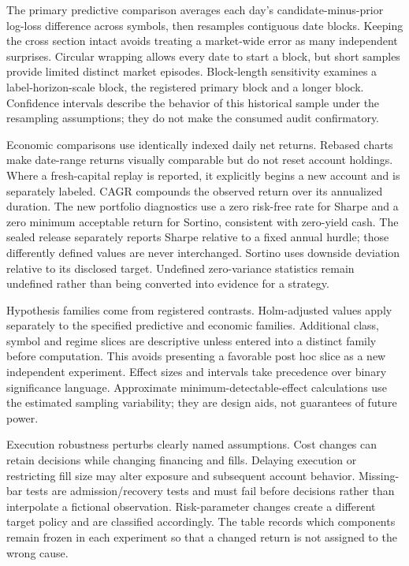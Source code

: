 \documentclass[11pt,a4paper]{article}
\begin{document}
The primary predictive comparison averages each day's candidate-minus-prior log-loss difference across symbols, then resamples contiguous date blocks. Keeping the cross section intact avoids treating a market-wide error as many independent surprises. Circular wrapping allows every date to start a block, but short samples provide limited distinct market episodes. Block-length sensitivity examines a label-horizon-scale block, the registered primary block and a longer block. Confidence intervals describe the behavior of this historical sample under the resampling assumptions; they do not make the consumed audit confirmatory.

Economic comparisons use identically indexed daily net returns. Rebased charts make date-range returns visually comparable but do not reset account holdings. Where a fresh-capital replay is reported, it explicitly begins a new account and is separately labeled. CAGR compounds the observed return over its annualized duration. The new portfolio diagnostics use a zero risk-free rate for Sharpe and a zero minimum acceptable return for Sortino, consistent with zero-yield cash. The sealed release separately reports Sharpe relative to a fixed annual hurdle; those differently defined values are never interchanged. Sortino uses downside deviation relative to its disclosed target. Undefined zero-variance statistics remain undefined rather than being converted into evidence for a strategy.

Hypothesis families come from registered contrasts. Holm-adjusted values apply separately to the specified predictive and economic families. Additional class, symbol and regime slices are descriptive unless entered into a distinct family before computation. This avoids presenting a favorable post hoc slice as a new independent experiment. Effect sizes and intervals take precedence over binary significance language. Approximate minimum-detectable-effect calculations use the estimated sampling variability; they are design aids, not guarantees of future power.

Execution robustness perturbs clearly named assumptions. Cost changes can retain decisions while changing financing and fills. Delaying execution or restricting fill size may alter exposure and subsequent account behavior. Missing-bar tests are admission/recovery tests and must fail before decisions rather than interpolate a fictional observation. Risk-parameter changes create a different target policy and are classified accordingly. The table records which components remain frozen in each experiment so that a changed return is not assigned to the wrong cause.
\end{document}

